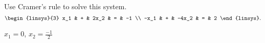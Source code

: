 
\begin{Exercise}[
name={},
title={}, 
difficulty=0,
origin={\cite{MB}}]
Use Cramer's rule to solve this system.
$$  
\begin{linsys}{3}
x_1 & + & 2x_2  & = & -1 \\
-x_1 & +  & -4x_2 & = & 2  
\end{linsys}.  
$$
\end{Exercise}

\begin{Answer}
$x_1=0$, $x_2=\frac{-1}{2}$
\end{Answer}
